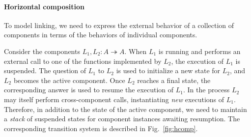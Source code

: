 \documentclass[11pt,oneside,draft]{book}
\theoremstyle{definition}
\newcommand{\kw}[1]{\ensuremath{ \mathsf{#1} }}
\newcommand{\que}{\circ}         %
\newcommand{\ans}{\bullet}       %
\begin{document}


\paragraph{Horizontal composition} \label{sec:sem:linker} %

To model linking,
we need to express the external behavior
of a collection of components
in terms of the behaviors of
individual components.

Consider the components $L_1, L_2 : A \twoheadrightarrow A$.
When $L_1$ is running and performs an external call
to one of the functions implemented by $L_2$,
the execution of $L_1$ is suspended.
The question of $L_1$ to $L_2$
is used to initialize a new state for $L_2$,
and $L_2$ becomes the active component.
Once $L_2$ reaches a final state,
the corresponding answer is used to resume
the execution of $L_1$.
In the process
$L_2$ may itself perform cross-component calls,
instantiating \emph{new} executions of $L_1$.
Therefore,
in addition to the state of the active component,
we need to maintain a \emph{stack} of suspended states
for component instances awaiting resumption.
The corresponding transition system
is described in Fig.~\ref{fig:hcomp}.
\end{document}
